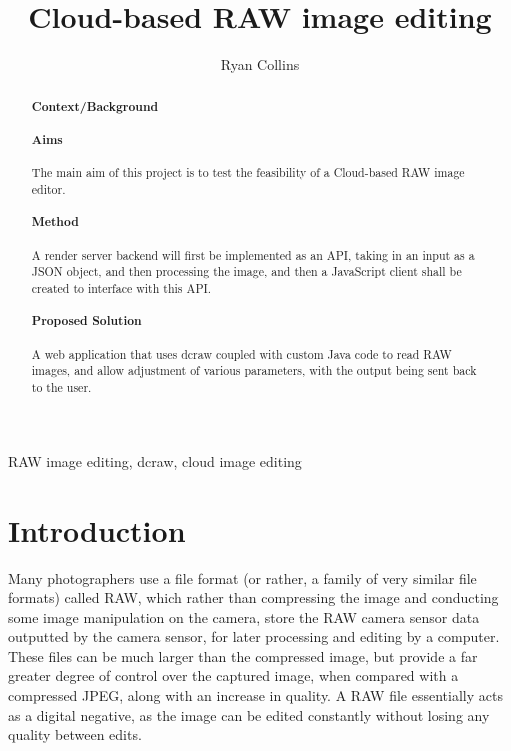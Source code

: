 \documentclass[12pt,a4paper]{article}
\title{Cloud-based RAW image editing}
\author{Ryan Collins}
\date{}
\begin{document}
\maketitle

\begin{abstract}
\paragraph{Context/Background}

\paragraph{Aims}
The main aim of this project is to test the feasibility of a Cloud-based RAW image
editor.
\paragraph{Method}
A render server backend will first be implemented as an API, taking in an input as a
JSON object, and then processing the image, and then a JavaScript
client shall be created to interface with this API.
\paragraph{Proposed Solution}
A web application that uses dcraw coupled with custom Java code to read RAW images,
and allow adjustment of various parameters, with the output being sent back to the user.
\end{abstract}

\begin{keywords}
RAW image editing, dcraw, cloud image editing
\end{keywords}

\section{Introduction}

Many photographers use a file format (or rather, a family of very similar file formats) called RAW,
which rather than compressing the image and conducting some image manipulation on the camera,
store the RAW camera sensor data outputted by the camera sensor, for later processing and editing
by a computer. These files can be much larger than the compressed image, but provide a far greater
degree of control over the captured image, when compared with a compressed JPEG, along with an
increase in quality. A RAW file essentially acts as a digital negative, as the image can be edited
constantly without losing any quality between edits.  \cite{AllAboutTheFormat}
\end{document}
